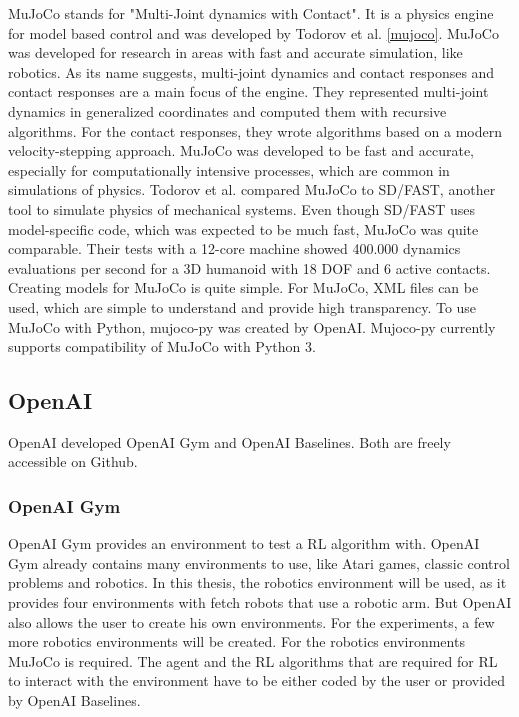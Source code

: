 MuJoCo stands for "Multi-Joint dynamics with Contact". It is a physics engine for model based control and was developed by Todorov et al. \ref{mujoco}.
MuJoCo was developed for research in areas with fast and accurate simulation, like robotics. As its name suggests, multi-joint dynamics and contact responses and contact responses are a main focus of the engine. They represented multi-joint dynamics in generalized coordinates and computed them with recursive algorithms. For the contact responses, they wrote algorithms based on a modern velocity-stepping approach. MuJoCo was developed to be fast and accurate, especially for computationally intensive processes, which are common in simulations of physics. 
\newline
Todorov et al. compared MuJoCo to SD/FAST, another tool to simulate physics of mechanical systems. Even though SD/FAST uses model-specific code, which was expected to be much fast, MuJoCo was quite comparable. Their tests with a 12-core machine showed 400.000 dynamics evaluations per second for a 3D humanoid with 18 DOF and 6 active contacts. 
Creating models for MuJoCo is quite simple. For MuJoCo, XML files can be used, which are simple to understand and provide high transparency. 
\newline
To use MuJoCo with Python, mujoco-py was created by OpenAI. Mujoco-py currently supports compatibility of MuJoCo with Python 3.

\subsection{OpenAI}
OpenAI developed OpenAI Gym and OpenAI Baselines. Both are freely accessible on Github.

\subsubsection{OpenAI Gym}
OpenAI Gym provides an environment to test a RL algorithm with. OpenAI Gym already contains many environments to use, like Atari games, classic control problems and robotics. In this thesis, the robotics environment will be used, as it provides four environments with fetch robots that use a robotic arm. But OpenAI also allows the user to create his own environments. For the experiments, a few more robotics environments will be created. For the robotics environments MuJoCo is required. 
The agent and the RL algorithms that are required for RL to interact with the environment have to be either coded by the user or provided by OpenAI Baselines.

